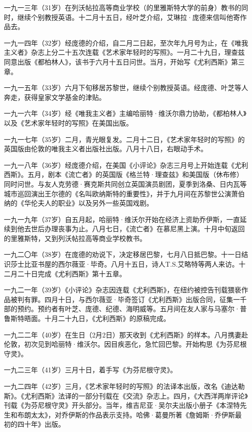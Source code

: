 \par 一九一三年（31岁）在列沃帖拉高等商业学校（的里雅斯特大学的前身）教书的同时，继续个别教授英语。十二月十五日，经叶芝介绍，艾琳拉·庞德来信叫他寄作品去。
\par 一九一四年（32岁）经庞德的介绍，自二月二日起，至次年九月号为止，在《唯我主义者》杂志上分二十五次连载《艺术家年轻时的写照》。一月二十九日，理查兹同意出版《都柏林人》，该书于六月十五日问世。当月，开始写《尤利西斯》第三章。
\par 一九一五年（33岁）六月下旬移居苏黎世，继续个别教授英语。经庞德、叶芝等人奔走，获得皇家文学基金的津贴。
\par 一九一六年（34岁）经《唯我主义者》主编哈丽特·维沃尔鼎力协助，《都柏林人》以及《艺术家年轻时的写照》在美国出版。
\par 一九一七年（35岁）二月，青光眼复发。二月十二日，《艺术家年轻时的写照》的英国版由伦敦的唯我主义者出版社出版。八月十八日，右眼动手术。
\par 一九一八年（36岁）经庞德介绍，在美国《小评论》杂志三月号上开始连载《尤利西斯》。五月，剧本《流亡者》的英国版《格兰特·理查兹》和美国版（休布修）同时问世。与友人克劳德·赛克斯共同创立英国演员剧团，夏季到洛桑、日内瓦等城市巡回演出王尔德的《名叫欧纳斯特的重要性》，并于九月间在苏黎世公演萧伯纳的《华伦夫人的职业》以及另外一些英国戏剧。
\par 一九一九年（37岁）自五月起，哈丽特·维沃尔开始在经济上资助乔伊斯，一直延续到他去世后办理丧事为止。八月七日，《流亡者》在慕尼黑上演。十月中旬返回的里雅斯特，又到列沃帖拉高等商业学校教书。
\par 一九二〇年（38岁）在庞德的劝说下，决定移居巴黎，七月八日抵巴黎。十一日结识莎士比亚书屋的西尔薇亚·毕奇。八月十五日，诗人T.S.艾略特等两人来访。十二月二十日完成《尤利西斯》第十五章。
\par 一九二一年（39岁）《小评论》杂志因连载《尤利西斯》，在纽约被控告刊载猥亵作品被判有罪。四月十日，与西尔薇亚·毕奇签订《尤利西斯》出版合同，征集一千部的预约。预约者有叶芝、庞德、纪德、海明威等。五月间在友人家与马塞尔·普鲁斯特晤面。十月二十九日，《尤利西斯》的原稿完成。
\par 一九二二年（40岁）在生日（2月2日）那天收到《尤利西斯》的样本。八月携妻赴伦敦，初次见到哈丽特·维沃尔。因目疾恶化，急忙回巴黎。开始构思《为芬尼根守灵》。
\par 一九二三年（41岁）三月十日，着手写《为芬尼根守灵》。
\par 一九二四年（42岁）三月，《艺术家年轻时的写照》的法译本出版，改名《迪达勒斯》。《尤利西斯》法译的一部分刊载在《交流》杂志上。四月，《大西洋两岸评论》刊载《为芬尼根守灵》开头部分。当年，维吉尼亚·吴尔夫出版小册子《本涅特先生和布朗太太》，对乔伊斯的作品表示支持。哈佛·葛曼所著《詹姆斯·乔伊斯最初的四十年》出版。
